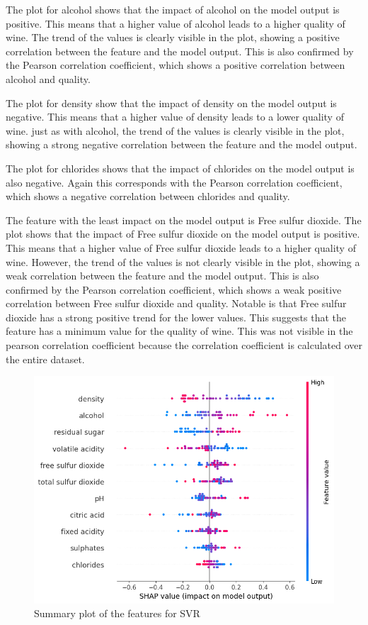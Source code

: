 \documentclass{article}
\begin{document}
The plot for alcohol shows that the impact of alcohol on the model output is positive.
This means that a higher value of alcohol leads to a higher quality of wine.
The trend of the values is clearly visible in the plot, showing a positive correlation between the feature and the model output. %
This is also confirmed by the Pearson correlation coefficient, which shows a positive correlation between alcohol and quality.

The plot for density show that the impact of density on the model output is negative.
This means that a higher value of density leads to a lower quality of wine.
just as with alcohol, the trend of the values is clearly visible in the plot, showing a strong negative correlation between the feature and the model output.

The plot for chlorides shows that the impact of chlorides on the model output is also negative. Again this corresponds with the Pearson correlation coefficient, which shows a negative correlation between chlorides and quality.

The feature with the least impact on the model output is Free sulfur dioxide.
The plot shows that the impact of Free sulfur dioxide on the model output is positive.
This means that a higher value of Free sulfur dioxide leads to a higher quality of wine.
However, the trend of the values is not clearly visible in the plot, showing a weak correlation between the feature and the model output.
This is also confirmed by the Pearson correlation coefficient, which shows a weak positive correlation between Free sulfur dioxide and quality.
Notable is that Free sulfur dioxide has a strong positive trend for the lower values. This suggests that the feature has a minimum value for the quality of wine.
This was not visible in the pearson correlation coefficient because the correlation coefficient is calculated over the entire dataset.

\begin{figure}
	\centering
	\includegraphics[width=\linewidth]{figures/shap-summary-svr.png}
	\caption{Summary plot of the features for SVR}
	\label{fig:summary-plot-svr}
\end{figure}
\end{document}
